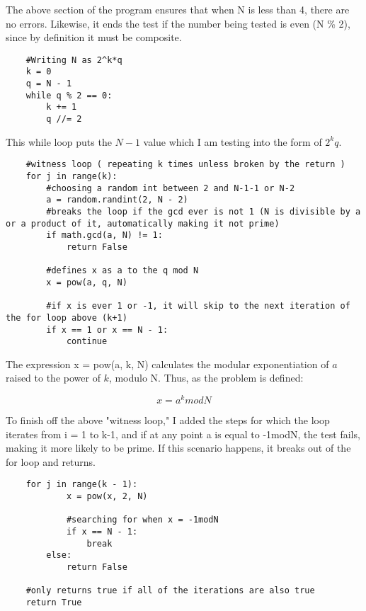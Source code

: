 \documentclass[11pt,a4paper]{article}
\begin{document}
The above section of the program ensures that when N is less than 4, there are no errors. Likewise, it ends the test if the number being tested is even (N \% 2), since by definition it must be composite. 

\vspace{2mm}

\begin{lstlisting}
    #Writing N as 2^k*q
    k = 0
    q = N - 1
    while q % 2 == 0:
        k += 1
        q //= 2
\end{lstlisting}

This while loop puts the $N-1$ value which I am testing into the form of $2^{k}q$. 

\vspace{2mm}

\begin{lstlisting}
    #witness loop ( repeating k times unless broken by the return )
    for j in range(k):
        #choosing a random int between 2 and N-1-1 or N-2
        a = random.randint(2, N - 2)
        #breaks the loop if the gcd ever is not 1 (N is divisible by a or a product of it, automatically making it not prime)
        if math.gcd(a, N) != 1:
            return False

        #defines x as a to the q mod N
        x = pow(a, q, N)

        #if x is ever 1 or -1, it will skip to the next iteration of the for loop above (k+1)
        if x == 1 or x == N - 1:
            continue
\end{lstlisting}

The expression x = pow(a, k, N) calculates the modular exponentiation of $a$ raised to the power of $k$, modulo N. Thus, as the problem is defined:

\[x = a^{k}modN\]

To finish off the above "witness loop," I added the steps for which the loop iterates from i = 1 to k-1, and if at any point a is equal to -1modN, the test fails, making it more likely to be prime. If this scenario happens, it breaks out of the for loop and returns. 

\clearpage

\begin{lstlisting}
    for j in range(k - 1):
            x = pow(x, 2, N)

            #searching for when x = -1modN
            if x == N - 1:
                break
        else:
            return False
    
    #only returns true if all of the iterations are also true
    return True
\end{lstlisting}
\end{document}
